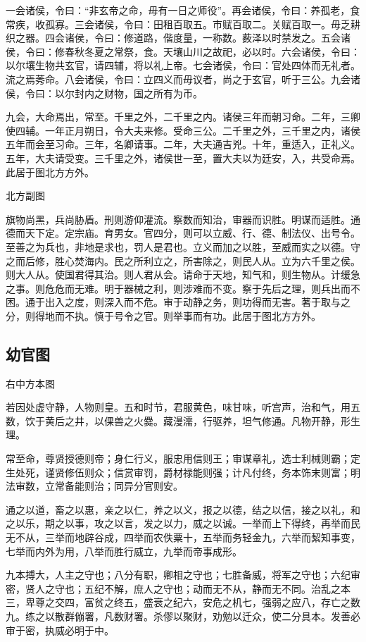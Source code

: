 \documentclass[]{article}
\begin{document}
一会诸侯，令曰：``非玄帝之命，毋有一日之师役''。再会诸侯，令曰：养孤老，食常疾，收孤寡。三会诸侯，令曰：田租百取五。市赋百取二。关赋百取一。毋乏耕织之器。四会诸侯，令曰：修道路，偕度量，一称数。薮泽以时禁发之。五会诸侯，令曰：修春秋冬夏之常祭，食。天壤山川之故祀，必以时。六会诸侯，令曰：以尔壤生物共玄官，请四辅，将以礼上帝。七会诸侯，令曰：官处四体而无礼者。流之焉莠命。八会诸侯，令曰：立四义而毋议者，尚之于玄官，听于三公。九会诸侯，令曰：以尔封内之财物，国之所有为币。

九会，大命焉出，常至。千里之外，二千里之内。诸侯三年而朝习命。二年，三卿使四辅。一年正月朔日，令大夫来修。受命三公。二千里之外，三千里之内，诸侯五年而会至习命。三年，名卿请事。二年，大夫通吉兇。十年，重适入，正礼义。五年，大夫请受变。三千里之外，诸侯世一至，置大夫以为廷安，入，共受命焉。此居于图北方方外。

北方副图

旗物尚黑，兵尚胁盾。刑则游仰灌流。察数而知治，审器而识胜。明谋而适胜。通德而天下定。定宗庙。育男女。官四分，则可以立威、行、德、制法仪、出号令。至善之为兵也，非地是求也，罚人是君也。立义而加之以胜，至威而实之以德。守之而后修，胜心焚海内。民之所利立之，所害除之，则民人从。立为六千里之侯。则大人从。使国君得其治。则人君从会。请命于天地，知气和，则生物从。计缓急之事。则危危而无难。明于器械之利，则涉难而不变。察于先后之理，则兵出而不困。通于出入之度，则深入而不危。审于动静之务，则功得而无害。著于取与之分，则得地而不执。慎于号令之官。则举事而有功。此居于图北方方外。

\hypertarget{header-n142}{%
\subsection{幼官图}\label{header-n142}}

右中方本图

若因处虚守静，人物则皇。五和时节，君服黄色，味甘味，听宫声，治和气，用五数，饮于黄后之井，以倮兽之火爨。藏漫濡，行驱养，坦气修通。凡物开静，形生理。

常至命，尊贤授德则帝；身仁行义，服忠用信则王；审谋章礼，选士利械则霸；定生处死，谨贤修伍则众；信赏审罚，爵材禄能则强；计凡付终，务本饰末则富；明法审数，立常备能则治；同异分官则安。

通之以道，畜之以惠，亲之以仁，养之以义，报之以德，结之以信，接之以礼，和之以乐，期之以事，攻之以言，发之以力，威之以诚。一举而上下得终，再举而民无不从，三举而地辟谷成，四举而农佚粟十，五举而务轻金九，六举而絜知事变，七举而内外为用，八举而胜行威立，九举而帝事成形。

九本搏大，人主之守也；八分有职，卿相之守也；七胜备威，将军之守也；六纪审密，贤人之守也；五纪不解，庶人之守也；动而无不从，静而无不同。治乱之本三，卑尊之交四，富贫之终五，盛衰之纪六，安危之机七，强弱之应八，存亡之数九。练之以散群傰署，凡数财署。杀僇以聚财，劝勉以迁众，使二分具本。发善必审于密，执威必明于中。
\end{document}

